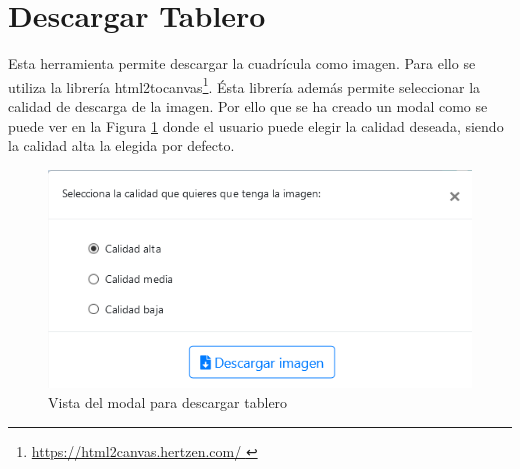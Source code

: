\section{Descargar Tablero}


Esta herramienta permite descargar la cuadrícula como imagen. Para ello se utiliza la librería html2tocanvas\footnote{\url{https://html2canvas.hertzen.com/ }}. Ésta librería además permite seleccionar la calidad de descarga de la imagen. Por ello que se ha creado un modal como se puede ver en la Figura \ref{fig:modaldescargartablero} donde el usuario puede elegir la calidad deseada, siendo la calidad alta la elegida por defecto. 


\begin{figure}[h!]
	\centering
	\includegraphics[width=0.7\linewidth]{Imagenes/Bitmap/modalDescargarTablero}
	\caption{Vista del modal para descargar tablero}
	\label{fig:modaldescargartablero}
\end{figure}





